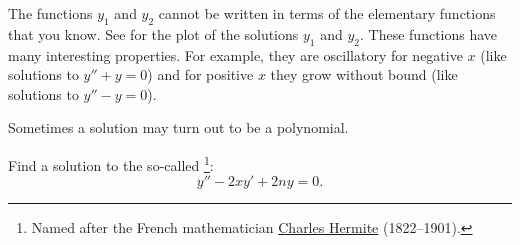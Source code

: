 \documentclass{ximera}
\begin{document}
The functions $y_1$ and $y_2$ cannot be written in terms of the elementary functions that you know.  See  for the plot of the solutions $y_1$ and $y_2$.  These functions have many interesting properties.  For example, they are oscillatory for negative $x$ (like solutions to $y''+y=0$) and for positive $x$ they grow without bound (like solutions to $y''-y=0$).


Sometimes a solution may turn out to be a polynomial.

\begin{example}
    Find a solution to the so-called \emph{}%
    \footnote{Named after the French mathematician \href{http://en.wikipedia.org/wiki/Hermite}{Charles Hermite} (1822--1901).}:
    \begin{equation*}
        y'' -2xy' + 2n y = 0 .
    \end{equation*}
\end{example}
\end{document}
